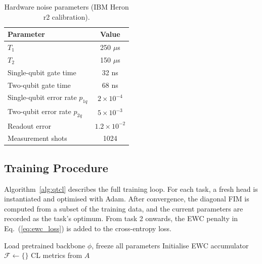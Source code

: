 \documentclass[acmlarge]{acmart}
\begin{document}
\begin{table}[h]
\centering
\caption{Hardware noise parameters (IBM Heron r2 calibration).}
\label{tab:noise_params}
\begin{tabular}{lc}
\toprule
Parameter & Value \\
\midrule
$T_1$ & 250 $\mu$s \\
$T_2$ & 150 $\mu$s \\
Single-qubit gate time & 32 ns \\
Two-qubit gate time & 68 ns \\
Single-qubit error rate $p_{1q}$ & $2 \times 10^{-4}$ \\
Two-qubit error rate $p_{2q}$ & $5 \times 10^{-3}$ \\
Readout error & $1.2 \times 10^{-2}$ \\
Measurement shots & 1024 \\
\bottomrule
\end{tabular}
\end{table}

\subsection{Training Procedure}
\label{subsec:training}

Algorithm~\ref{alg:qtcl} describes the full training loop.
For each task, a fresh head is instantiated and optimised with Adam.
After convergence, the diagonal FIM is computed from a subset of the training data, and the current parameters are recorded as the task's optimum.
From task 2 onwards, the EWC penalty in Eq.~(\ref{eq:ewc_loss}) is added to the cross-entropy loss.

\begin{algorithm}[H]
\SetAlgoLined
{}
Load pretrained backbone $\phi$, freeze all parameters\;
Initialise EWC accumulator $\mathcal{F} \leftarrow \{\}$\;
\Return CL metrics from $A$\;
\caption{QTCL: Quantum Transfer-Continual Learning}
\label{alg:qtcl}
\end{algorithm}
\end{document}
